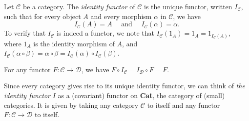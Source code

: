 \documentclass[12pt]{article}
\begin{document}
Let $\mathcal{C}$ be a category.  The \emph{identity functor} of $\mathcal{C}$ is the unique functor, written $I_{\mathcal{C}}$, such that for every object $A$ and every morphism $\alpha$ in $\mathcal{C}$, we have 
$$I_{\mathcal{C}}(A)=A\quad\mbox{ and }\quad I_{\mathcal{C}}(\alpha)=\alpha.$$  To verify that $I_{\mathcal{C}}$ is indeed a functor, we note that $I_{\mathcal{C}}(1_A)=1_A=1_{I_{\mathcal{C}}(A)}$, where $1_A$ is the identity morphism of $A$, and $I_{\mathcal{C}}(\alpha\circ\beta)=\alpha\circ \beta=I_{\mathcal{C}}(\alpha)\circ I_{\mathcal{C}}(\beta)$.

For any functor $F:\mathcal{C}\to \mathcal{D}$, we have $F\circ I_{\mathcal{C}}= I_{\mathcal{D}}\circ F=F$.

Since every category gives rise to its unique identity functor, we can think of \emph{the identity functor} $I$ as a (covariant) functor on \textbf{Cat}, the category of (small) categories.  It is given by taking any category $\mathcal{C}$ to itself and any functor $F:\mathcal{C}\to \mathcal{D}$ to itself.
\end{document}
